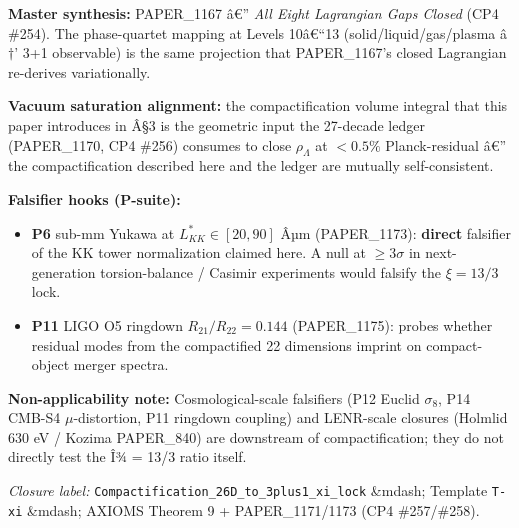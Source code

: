 \documentclass[12pt,a4paper]{article}
\begin{document}
\textbf{Master synthesis:} PAPER\_1167 â€'' \emph{All Eight Lagrangian Gaps Closed} (CP4 \#254). The phase-quartet mapping at Levels 10â€``13 (solid/liquid/gas/plasma â$\dagger$' 3+1 observable) is the same projection that PAPER\_1167's closed Lagrangian re-derives variationally.

\textbf{Vacuum saturation alignment:} the compactification volume integral that this paper introduces in Â\S{}3 is the geometric input the 27-decade ledger (PAPER\_1170, CP4 \#256) consumes to close $\rho_\Lambda$ at $<0.5\%$ Planck-residual â€'' the compactification described here and the ledger are mutually self-consistent.

\textbf{Falsifier hooks (P-suite):}

\begin{itemize}
  \item \textbf{P6} sub-mm Yukawa at $L_{KK}^{*} \in [20, 90]$ Âµm (PAPER\_1173): \textbf{direct} falsifier of the KK tower normalization claimed here. A null at $\geq 3\sigma$ in next-generation torsion-balance / Casimir experiments would falsify the $\xi = 13/3$ lock.
  \item \textbf{P11} LIGO O5 ringdown $R_{21}/R_{22} = 0.144$ (PAPER\_1175): probes whether residual modes from the compactified 22 dimensions imprint on compact-object merger spectra.
\end{itemize}

\textbf{Non-applicability note:} Cosmological-scale falsifiers (P12 Euclid $\sigma_8$, P14 CMB-S4 $\mu$-distortion, P11 ringdown coupling) and LENR-scale closures (Holmlid 630 eV / Kozima PAPER\_840) are downstream of compactification; they do not directly test the Î¾ = 13/3 ratio itself.

\emph{Closure label:} \texttt{Compactification\_26D\_to\_3plus1\_xi\_lock} \&mdash; Template \texttt{T-xi} \&mdash; AXIOMS Theorem 9 + PAPER\_1171/1173 (CP4 \#257/\#258).
\end{document}
